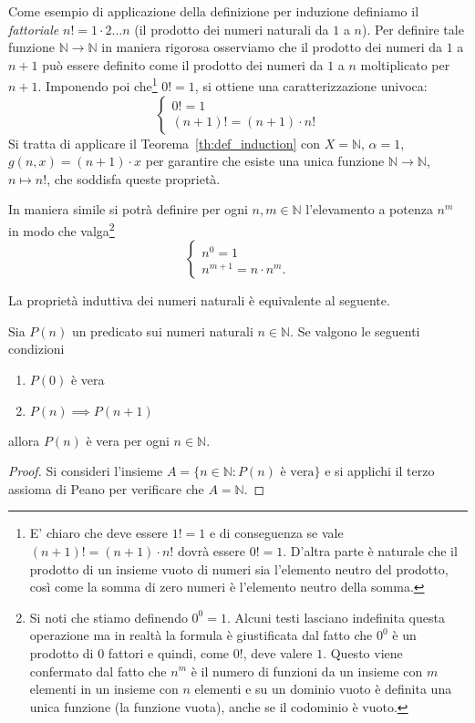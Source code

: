 \documentclass[italian,a4paper,hidelinks,headinclude]{scrartcl}
\newcommand{\NN}{{\mathbb N}}
\begin{document}
Come esempio di applicazione della definizione per induzione definiamo
il \emph{fattoriale} $n! = 1 \cdot 2 \dots n$ (il prodotto dei numeri naturali
da $1$ a $n$).
Per definire tale funzione
$\NN \to \NN$ in maniera rigorosa osserviamo che il prodotto dei numeri da $1$
a $n+1$ può essere definito come il prodotto dei numeri da $1$ a $n$ moltiplicato
per $n+1$. Imponendo poi che\footnote{%
E' chiaro che deve essere $1!=1$ e di conseguenza se vale $(n+1)! = (n+1)\cdot n!$
dovrà essere $0!=1$.
D'altra parte è naturale che il prodotto di un insieme vuoto di numeri sia
l'elemento neutro del prodotto, così come la somma di zero numeri è l'elemento
neutro della somma.
}
$0!=1$, si ottiene una caratterizzazione univoca:
\[
 \begin{cases}
  0! = 1 \\
  (n+1)! = (n+1) \cdot n!
 \end{cases}
\]
Si tratta di applicare il Teorema~\ref{th:def_induction}
con $X=\NN$, $\alpha = 1$, $g(n, x) = (n+1)\cdot x$ per garantire che esiste
una unica funzione $\NN\to\NN$, $n\mapsto n!$, che soddisfa queste proprietà.

In maniera simile si potrà definire per ogni $n,m \in \NN$ l'elevamento a potenza $n^m$
in modo che valga\footnote{%
Si noti che stiamo definendo $0^0=1$.
Alcuni testi lasciano indefinita questa operazione ma in realtà la formula
è giustificata dal fatto che $0^0$ è un prodotto di $0$ fattori e quindi,
come $0!$, deve valere $1$.
Questo viene confermato dal fatto che $n^m$ è il numero di funzioni da un
insieme con $m$ elementi in un insieme con $n$ elementi e
su un dominio vuoto è definita una unica funzione (la funzione vuota), anche
se il codominio è vuoto.
}
\[
\begin{cases}
  n^0 = 1\\
  n^{m+1} = n\cdot n^m.
\end{cases}
\]

La proprietà induttiva dei numeri naturali è equivalente al seguente.
\begin{theorem}
Sia $P(n)$ un predicato sui numeri naturali $n\in \NN$.
Se valgono le seguenti condizioni
\begin{enumerate}
\item $P(0)$ è vera
\item $P(n) \implies P(n+1)$
\end{enumerate}
allora $P(n)$ è vera per ogni $n\in \NN$.
\end{theorem}
%
\begin{proof}
Si consideri l'insieme $A=\{n\in \NN\colon \text{$P(n)$ è vera}\}$ e si
applichi il terzo assioma di Peano per verificare che $A=\NN$.
\end{proof}
\end{document}
